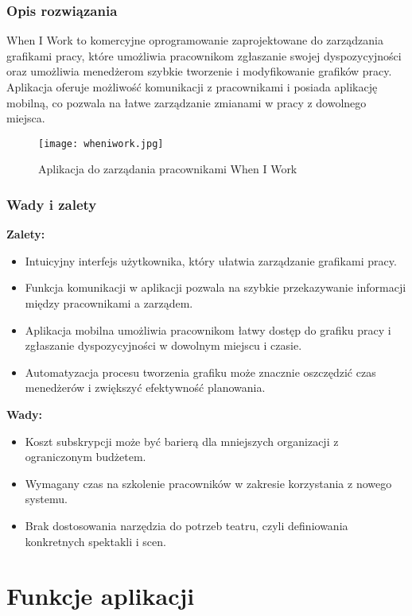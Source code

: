 \documentclass[shortabstract]{iithesis}
\begin{document}
\subsubsection{Opis rozwiązania}
When I Work to komercyjne oprogramowanie zaprojektowane do zarządzania grafikami pracy, które umożliwia pracownikom zgłaszanie swojej dyspozycyjności oraz umożliwia menedżerom szybkie tworzenie i modyfikowanie grafików pracy. Aplikacja oferuje możliwość komunikacji z pracownikami i posiada aplikację mobilną, co pozwala na łatwe zarządzanie zmianami w pracy z dowolnego miejsca.
\begin{figure}[h]
    \centering
    \texttt{[image: wheniwork.jpg]}
    \caption{Aplikacja do zarządania pracownikami When I Work}
    \label{fig:wiw}
\end{figure}



\subsubsection{Wady i zalety}

\textbf{Zalety:}
\begin{itemize}
  \item Intuicyjny interfejs użytkownika, który ułatwia zarządzanie grafikami pracy.
  \item Funkcja komunikacji w aplikacji pozwala na szybkie przekazywanie informacji między pracownikami a zarządem.
  \item Aplikacja mobilna umożliwia pracownikom łatwy dostęp do grafiku pracy i zgłaszanie dyspozycyjności w dowolnym miejscu i czasie.
  \item Automatyzacja procesu tworzenia grafiku może znacznie oszczędzić czas menedżerów i zwiększyć efektywność planowania.
\end{itemize}


\textbf{Wady:}
\begin{itemize}
  \item Koszt subskrypcji może być barierą dla mniejszych organizacji z ograniczonym budżetem.
  \item Wymagany czas na szkolenie pracowników w zakresie korzystania z nowego systemu.
  \item Brak dostosowania narzędzia do potrzeb teatru, czyli definiowania konkretnych spektakli i scen.
\end{itemize}

\section{Funkcje aplikacji}
\end{document}
